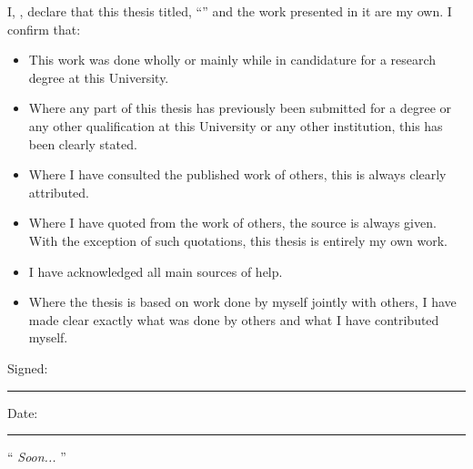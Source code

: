 \documentclass[
12pt, %
oneside, %
english, %
onehalfspacing, %
headsepline, %
]{MastersDoctoralThesis} %
\begin{document}

\begin{declaration}
\addchaptertocentry{\authorshipname} %
\noindent I, \authorname, declare that this thesis titled, \enquote{\ttitle} and the work presented in it are my own. I confirm that:

\begin{itemize} 
\item This work was done wholly or mainly while in candidature for a research degree at this University.
\item Where any part of this thesis has previously been submitted for a degree or any other qualification at this University or any other institution, this has been clearly stated.
\item Where I have consulted the published work of others, this is always clearly attributed.
\item Where I have quoted from the work of others, the source is always given. With the exception of such quotations, this thesis is entirely my own work.
\item I have acknowledged all main sources of help.
\item Where the thesis is based on work done by myself jointly with others, I have made clear exactly what was done by others and what I have contributed myself.\\
\end{itemize}
 
\noindent Signed:\\
\rule[0.5em]{25em}{0.5pt} %
 
\noindent Date:\\
\rule[0.5em]{25em}{0.5pt} %
\end{declaration}

\cleardoublepage


\vspace*{0.2\textheight}

\noindent\enquote{\itshape 
Soon... %
}
\bigbreak
\end{document}
